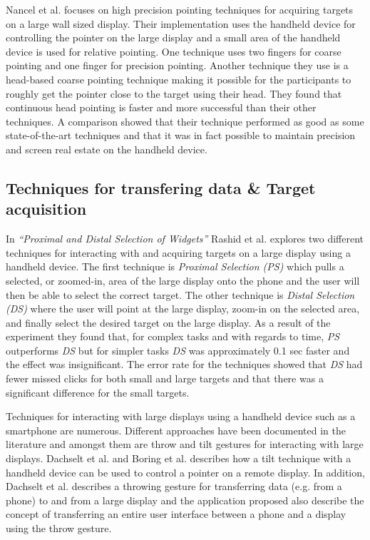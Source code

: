Nancel et al. \cite{Nancel:2013} focuses on high precision pointing techniques for acquiring targets on a large wall sized display.
Their implementation uses the handheld device for controlling the pointer on the large display and a small area of the handheld device is used for relative pointing.
One technique uses two fingers for coarse pointing and one finger for precision pointing. 
Another technique they use is a head-based coarse pointing technique making it possible for the participants to roughly get the pointer close to the target using their head.
They found that continuous head pointing is faster and more successful than their other techniques.
A comparison showed that their technique performed as good as some state-of-the-art techniques and that it was in fact possible to maintain precision and screen real estate on the handheld device.

\subsection{Techniques for transfering data \& Target acquisition} \label{sec:targetAcquisition}
In \emph{``Proximal and Distal Selection of Widgets''} Rashid et al. \cite{Rashid:2011} explores two different techniques for interacting with and acquiring targets on a large display using a handheld device.
The first technique is \emph{Proximal Selection (PS)} which pulls a selected, or zoomed-in, area of the large display onto the phone and the user will then be able to select the correct target.
The other technique is \emph{Distal Selection (DS)} where the user will point at the large display, zoom-in on the selected area, and finally select the desired target on the large display.
As a result of the experiment they found that, for complex tasks and with regards to time, \emph{PS} outperforms \emph{DS} but for simpler tasks \emph{DS} was approximately 0.1 sec faster and the effect was insignificant.
The error rate for the techniques showed that \emph{DS} had fewer missed clicks for both small and large targets and that there was a significant difference for the small targets.

Techniques for interacting with large displays using a handheld device such as a smartphone are numerous.
Different approaches have been documented in the literature and amongst them are throw and tilt gestures for interacting with large displays.
Dachselt et al. \cite{Dachselt:2008} and Boring et al. \cite{Boring:2009} describes how a tilt technique with a handheld device can be used to control a pointer on a remote display.
In addition, Dachselt et al. describes a throwing gesture for transferring data (e.g. from a phone) to and from a large display and the application proposed also describe the concept of transferring an entire user interface between a phone and a display using the throw gesture.




